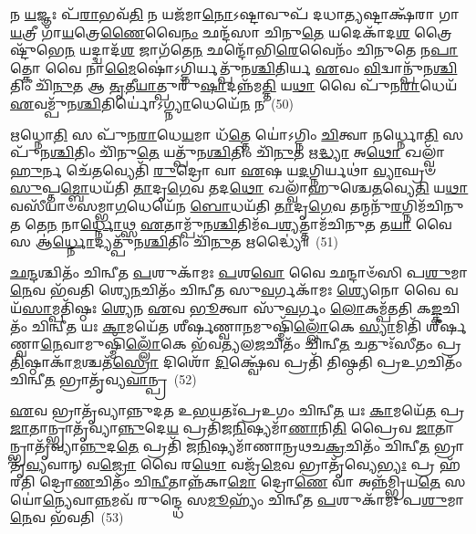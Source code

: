 𑌨 \ul{𑌯}\-𑌜𑍍𑌞𑌃 𑌪᳴\-\ul{𑌰𑌾}\-𑌭𑌵᳴\-\ul{𑌤𑌿} 𑌨 𑌯𑌜᳴𑌮𑌾\-\ul{𑌨𑍋}\-\-𑌽𑌷𑍍𑌟𑌾𑌵𑍁𑌪᳴ 𑌦𑌧𑌾\-\ul{𑌤𑍍𑌯}\-𑌷𑍍𑌟𑌾𑌕𑍍𑌷᳴𑌰𑌾 𑌗𑌾\-\ul{𑌯}\-𑌤𑍍𑌰𑍀 𑌗𑌾᳴\-\ul{𑌯}\-𑌤𑍍𑌰𑍇\-\ul{𑌣𑍈}\-𑌵𑍈\-\ul{𑌨𑌂} 𑌛𑌨𑍍𑌦᳴𑌸𑌾 𑌚𑌿𑌨𑍁\-\ul{𑌤𑍇} 𑌯𑌦𑍇𑌕𑌾᳴\-𑌦\-\ul{𑌶} 𑌤𑍍𑌰𑍈𑌷𑍍𑌟𑍁᳴𑌭𑍇\-\ul{𑌨} 𑌯𑌦𑍍𑌦𑍍𑌵𑌾𑌦᳴\-\ul{𑌶} 𑌜𑌾𑌗᳴𑌤𑍇\-\ul{𑌨} 𑌛𑌨𑍍𑌦𑍋᳴𑌭𑌿\-\ul{𑌰𑍇}\-𑌵𑍈𑌨𑌂᳴ 𑌚𑌿𑌨𑍁𑌤𑍇 𑌨\-\ul{𑌪𑌾}\-𑌤𑍍𑌕𑍋 𑌵𑍈 𑌨𑌾\-\ul{𑌮𑍈}\-𑌷𑍋॑\-𑌽𑌗𑍍𑌨𑌿𑌰𑍍𑌯𑌤𑍍𑌪𑍁᳴𑌨\-\ul{𑌶𑍍𑌚𑌿}\-𑌤𑌿𑌰𑍍𑌯 \ul{𑌏}\-𑌵𑌂 \ul{𑌵𑌿}\-𑌦𑍍𑌵𑌾𑌨𑍍𑌪𑍁᳴𑌨\-\ul{𑌶𑍍𑌚𑌿}\-𑌤𑌿𑌂 𑌚𑌿᳴\-\ul{𑌨𑍁}\-𑌤 𑌆 \ul{𑌤𑍃}\-𑌤𑍀\-\ul{𑌯𑌾}\-𑌤𑍍𑌪𑍁𑌰𑍁᳴\-\ul{𑌷𑌾}\-𑌦𑌨𑍍𑌨᳴𑌮\-\ul{𑌤𑍍𑌤𑌿} 𑌯\-\ul{𑌥𑌾} 𑌵𑍈 𑌪𑍁᳴𑌨\-\ul{𑌰𑌾}\-𑌧𑍇𑌯᳴ \ul{𑌏}\-𑌵𑌮𑍍𑌪𑍁᳴𑌨\-\ul{𑌶𑍍𑌚𑌿}\-𑌤𑌿𑌰𑍍𑌯𑍋॑\-𑌽\-\ul{𑌗𑍍𑌨𑍍𑌯𑌾}\-𑌧𑍇𑌯𑍇᳴\-\ul{𑌨} 𑌨~(50)

\-\ul{𑌋}\-𑌧𑍍𑌨𑍋\-\ul{𑌤𑌿} 𑌸 𑌪𑍁᳴𑌨\-\ul{𑌰𑌾}\-𑌧𑍇\-\ul{𑌯}\-𑌮𑌾 𑌧᳴\-\ul{𑌤𑍍𑌤𑍇} 𑌯𑍋॑\-𑌽𑌗𑍍𑌨𑌿𑌂 \ul{𑌚𑌿}\-𑌤𑍍𑌵𑌾 𑌨𑌰𑍍𑌧𑍍𑌨𑍋\-\ul{𑌤𑌿} 𑌸 𑌪𑍁᳴𑌨\-\ul{𑌶𑍍𑌚𑌿}\-𑌤𑌿𑌂 𑌚𑌿᳴𑌨𑍁\-\ul{𑌤𑍇} 𑌯𑌤𑍍𑌪𑍁᳴𑌨\-\ul{𑌶𑍍𑌚𑌿}\-𑌤𑌿𑌂 𑌚𑌿᳴\-\ul{𑌨𑍁}\-𑌤 𑌋\-\ul{𑌦𑍍𑌧𑍍𑌯𑌾} 𑌅\-\ul{𑌥𑍋} 𑌖𑌲𑍍𑌵𑌾᳴\-\ul{𑌹𑍁}\-𑌰𑍍𑌨 𑌚𑍇᳴\-\ul{𑌤}\-𑌵𑍍𑌯𑍇𑌤𑌿᳴ \ul{𑌰𑍁}\-𑌦𑍍𑌰𑍋 𑌵𑌾 \ul{𑌏}\-𑌷 𑌯\-\ul{𑌦}\-𑌗𑍍𑌨𑌿𑌰𑍍𑌯𑌥𑌾॑ \ul{𑌵𑍍𑌯𑌾}\-𑌘𑍍𑌰𑍞 \ul{𑌸𑍁}\-𑌪𑍍𑌤\-\ul{𑌮𑍍𑌬𑍋}\-𑌧𑌯᳴𑌤𑌿 \ul{𑌤𑌾}\-𑌦𑍃\-\ul{𑌗𑍇}\-𑌵 𑌤𑌦\-\ul{𑌥𑍋} 𑌖𑌲𑍍𑌵𑌾᳴𑌹𑍁𑌶𑍍𑌚𑍇\-\ul{𑌤}\-𑌵𑍍𑌯𑍇\-\ul{𑌤𑌿} 𑌯\-\ul{𑌥𑌾} 𑌵𑌸𑍀᳴𑌯𑌾𑍞𑌸𑌮𑍍𑌭𑌾\-\ul{𑌗}\-𑌧𑍇𑌯𑍇᳴𑌨 \ul{𑌬𑍋}\-𑌧𑌯᳴𑌤𑌿 \ul{𑌤𑌾}\-𑌦𑍃\-\ul{𑌗𑍇}\-𑌵 𑌤𑌨𑍍𑌮𑌨𑍁᳴\-\ul{𑌰}\-𑌗𑍍𑌨𑌿𑌮᳴𑌚𑌿𑌨𑍁\-\ul{𑌤} 𑌤𑍇\-\ul{𑌨} 𑌨𑌾\-\ul{𑌰𑍍𑌧𑍍𑌨𑍋}\-𑌥𑍍𑌸 \ul{𑌏}\-𑌤𑌾𑌮𑍍𑌪𑍁᳴𑌨\-\ul{𑌶𑍍𑌚𑌿}\-𑌤𑌿𑌮᳴𑌪\-\ul{𑌶𑍍𑌯}\-𑌤𑍍𑌤𑌾𑌮᳴𑌚𑌿𑌨𑍁\-\ul{𑌤} 𑌤\-\ul{𑌯𑌾} 𑌵𑍈 𑌸 𑌆॑\-\ul{𑌰𑍍𑌧𑍍𑌨𑍋}\-𑌦𑍍𑌯𑌤𑍍𑌪𑍁᳴𑌨\-\ul{𑌶𑍍𑌚𑌿}\-𑌤𑌿𑌂 𑌚𑌿᳴\-\ul{𑌨𑍁}\-𑌤 𑌋𑌦𑍍𑌧𑍍𑌯𑍈॑॥~(51)

{\anuvakamend[{\-\ul{𑌤𑍍𑌰𑌿}\-𑌵𑍃𑌦\-\ul{𑌥} 𑌤𑌿𑌷𑍍𑌠᳴𑌨𑍍𑌤𑍍𑌯\-\ul{𑌗𑍍𑌨𑍍𑌯𑌾}\-𑌧𑍇𑌯𑍇᳴\-\ul{𑌨} 𑌨𑌾𑌚𑌿᳴𑌨𑍁𑌤 \ul{𑌸}\-𑌪𑍍𑌤𑌦᳴𑌶 𑌚}]}%

\-\ul{𑌛}\-\-\ul{𑌨𑍍𑌦}\-𑌶𑍍𑌚𑌿𑌤𑌂᳴ 𑌚𑌿𑌨𑍍𑌵𑍀𑌤 \ul{𑌪}\-𑌶𑍁𑌕𑌾᳴𑌮𑌃 \ul{𑌪}\-𑌶\-\ul{𑌵𑍋} 𑌵𑍈 𑌛𑌨𑍍𑌦𑌾𑍞᳴𑌸𑌿 𑌪\-\ul{𑌶𑍁}\-𑌮𑌾\-\ul{𑌨𑍇}\-𑌵 𑌭᳴𑌵𑌤𑌿 𑌶𑍍𑌯𑍇\-\ul{𑌨}\-𑌚𑌿𑌤𑌂᳴ 𑌚𑌿𑌨𑍍𑌵𑍀𑌤 𑌸𑍁\-\ul{𑌵}\-𑌰𑍍𑌗𑌕𑌾᳴𑌮𑌃 \ul{𑌶𑍍𑌯𑍇}\-𑌨𑍋 𑌵𑍈 𑌵𑌯᳴\-\ul{𑌸𑌾}\-𑌮𑍍𑌪𑌤𑌿᳴𑌷𑍍𑌠𑌃 \ul{𑌶𑍍𑌯𑍇}\-𑌨 \ul{𑌏}\-𑌵 \ul{𑌭𑍂}\-𑌤𑍍𑌵𑌾 𑌸𑍁᳴\-\ul{𑌵}\-𑌰𑍍𑌗𑌂 \ul{𑌲𑍋}\-𑌕𑌮𑍍𑌪᳴𑌤𑌤𑌿 𑌕\-\ul{𑌙𑍍𑌕}\-𑌚𑌿𑌤𑌂᳴ 𑌚𑌿𑌨𑍍𑌵𑍀\-\ul{𑌤} 𑌯𑌃 \ul{𑌕𑌾}\-𑌮𑌯𑍇᳴𑌤 𑌶𑍀𑌰𑍍\mbox{}\-\ul{𑌷}\-𑌣𑍍𑌵𑌾\-\ul{𑌨}\-𑌮𑍁𑌷𑍍𑌮𑌿᳴\-\ul{𑌲𑍍𑌲𑍋𑌁}\-𑌕𑍇 \ul{𑌸𑍍𑌯𑌾}\-𑌮𑌿𑌤𑌿᳴ 𑌶𑍀𑌰𑍍\mbox{}\-\ul{𑌷}\-𑌣𑍍𑌵𑌾\-\ul{𑌨𑍇}\-𑌵𑌾𑌮𑍁𑌷𑍍𑌮𑌿᳴\-\ul{𑌲𑍍𑌲𑍋𑌁}\-𑌕𑍇 𑌭᳴𑌵𑌤𑍍𑌯𑌲\-\ul{𑌜}\-𑌚𑌿𑌤𑌂᳴ 𑌚𑌿𑌨𑍍𑌵𑍀\-\ul{𑌤} 𑌚𑌤𑍁𑌃᳴𑌸𑍀𑌤𑌂 𑌪𑍍𑌰\-\ul{𑌤𑌿}\-𑌷𑍍𑌠𑌾𑌕𑌾᳴\-\ul{𑌮}\-𑌶𑍍𑌚𑌤᳴\-\ul{𑌸𑍍𑌰𑍋} 𑌦𑌿𑌶𑍋᳴ \ul{𑌦𑌿}\-𑌕𑍍𑌷𑍍𑌵𑍇᳴𑌵 𑌪𑍍𑌰𑌤𑌿᳴ 𑌤𑌿𑌷𑍍𑌠𑌤𑌿 𑌪𑍍𑌰𑌉\-\ul{𑌗}\-𑌚𑌿𑌤𑌂᳴ 𑌚𑌿𑌨𑍍𑌵𑍀\-\ul{𑌤} 𑌭𑍍𑌰𑌾𑌤𑍃᳴𑌵𑍍𑌯\-\ul{𑌵𑌾}\-𑌨𑍍𑌪𑍍𑌰~(52)

\-\ul{𑌏}\-𑌵 𑌭𑍍𑌰𑌾𑌤𑍃᳴𑌵𑍍𑌯𑌾𑌨𑍍𑌨𑍁𑌦𑌤 𑌉\-\ul{𑌭}\-𑌯𑌤𑌃᳴𑌪𑍍𑌰𑌉𑌗𑌂 𑌚𑌿𑌨𑍍𑌵𑍀\-\ul{𑌤} 𑌯𑌃 \ul{𑌕𑌾}\-𑌮𑌯𑍇᳴\-\ul{𑌤} 𑌪𑍍𑌰 \ul{𑌜𑌾}\-𑌤𑌾𑌨𑍍𑌭𑍍𑌰𑌾𑌤𑍃᳴𑌵𑍍𑌯𑌾\-\ul{𑌨𑍍𑌨𑍁}\-𑌦𑍇\-\ul{𑌯} 𑌪𑍍𑌰𑌤𑌿᳴𑌜\-\ul{𑌨𑌿}\-𑌷𑍍𑌯𑌮𑌾᳴\-\ul{𑌣𑌾}\-𑌨𑌿\-\ul{𑌤𑌿} 𑌪𑍍𑌰𑍈𑌵 \ul{𑌜𑌾}\-𑌤𑌾𑌨𑍍𑌭𑍍𑌰𑌾𑌤𑍃᳴𑌵𑍍𑌯𑌾\-\ul{𑌨𑍍𑌨𑍁}\-𑌦\-\ul{𑌤𑍇} 𑌪𑍍𑌰𑌤𑌿᳴ 𑌜\-\ul{𑌨𑌿}\-𑌷𑍍𑌯𑌮𑌾᳴𑌣𑌾𑌨𑍍𑌰𑌥𑌚\-\ul{𑌕𑍍𑌰}\-𑌚𑌿𑌤𑌂᳴ 𑌚𑌿𑌨𑍍𑌵𑍀\-\ul{𑌤} 𑌭𑍍𑌰𑌾𑌤𑍃᳴\-\ul{𑌵𑍍𑌯}\-𑌵𑌾𑌨𑍍 𑌵\-\ul{𑌜𑍍𑌰𑍋} 𑌵𑍈 𑌰\-\ul{𑌥𑍋} 𑌵𑌜𑍍𑌰᳴\-\ul{𑌮𑍇}\-𑌵 𑌭𑍍𑌰𑌾𑌤𑍃᳴𑌵𑍍𑌯𑍇\-\ul{𑌭𑍍𑌯𑌃} 𑌪𑍍𑌰 𑌹᳴𑌰𑌤𑌿 𑌦𑍍𑌰𑍋\-\ul{𑌣}\-𑌚𑌿𑌤𑌂᳴ 𑌚𑌿\-\ul{𑌨𑍍𑌵𑍀}\-𑌤𑌾𑌨𑍍𑌨᳴𑌕𑌾\-\ul{𑌮𑍋} 𑌦𑍍𑌰𑍋\-\ul{𑌣𑍇} 𑌵𑌾 𑌅𑌨𑍍𑌨᳴𑌮𑍍𑌭𑍍𑌰𑌿𑌯\-\ul{𑌤𑍇} 𑌸𑌯𑍋॑\-\ul{𑌨𑍍𑌯𑍇}\-𑌵𑌾\-\ul{𑌨𑍍𑌨}\-𑌮𑌵᳴ 𑌰𑍁𑌨𑍍𑌦𑍍𑌧𑍇 𑌸\-\ul{𑌮𑍂}\-𑌹𑍍𑌯𑌂᳴ 𑌚𑌿𑌨𑍍𑌵𑍀𑌤 \ul{𑌪}\-𑌶𑍁𑌕𑌾᳴𑌮𑌃 𑌪\-\ul{𑌶𑍁}\-𑌮𑌾\-\ul{𑌨𑍇}\-𑌵 𑌭᳴𑌵𑌤𑌿~(53)

